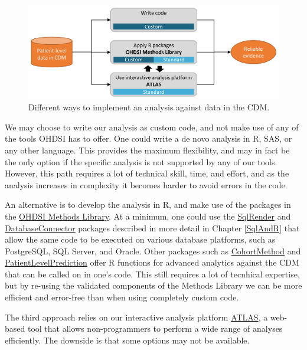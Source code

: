 \documentclass[11pt]{book}
\begin{document}
\begin{figure}

{\centering \includegraphics[width=0.9\linewidth]{images/OhdsiAnalyticsTools/implementations} 

}

\caption{Different ways to implement an analysis against data in the CDM.}\label{fig:implementations}
\end{figure}

We may choose to write our analysis as custom code, and not make use of
any of the tools OHDSI has to offer. One could write a de novo analysis
in R, SAS, or any other language. This provides the maximum flexibility,
and may in fact be the only option if the specific analysis is not
supported by any of our tools. However, this path requires a lot of
technical skill, time, and effort, and as the analysis increases in
complexity it becomes harder to avoid errors in the code.

An alternative is to develop the analysis in R, and make use of the
packages in the \href{https://ohdsi.github.io/MethodsLibrary/}{OHDSI
Methods Library}. At a minimum, one could use the
\href{https://ohdsi.github.io/SqlRender/}{SqlRender} and
\href{https://ohdsi.github.io/DatabaseConnector/}{DatabaseConnector}
packages described in more detail in Chapter \ref{SqlAndR} that allow
the same code to be executed on various database platforms, such as
PostgreSQL, SQL Server, and Oracle. Other packages such as
\href{https://ohdsi.github.io/CohortMethod/}{CohortMethod} and
\href{https://ohdsi.github.io/PatientLevelPrediction/}{PatientLevelPrediction}
offer R functions for advanced analytics against the CDM that can be
called on in one's code. This still requires a lot of tecnhical
expertise, but by re-using the validated components of the Methods
Library we can be more efficient and error-free than when using
completely custom code.

The third approach relies on our interactive analysis platform
\href{https://github.com/OHDSI/Atlas/wiki}{ATLAS}, a web-based tool that
allows non-programmers to perform a wide range of analyses efficiently.
The downside is that some options may not be available.
\end{document}
